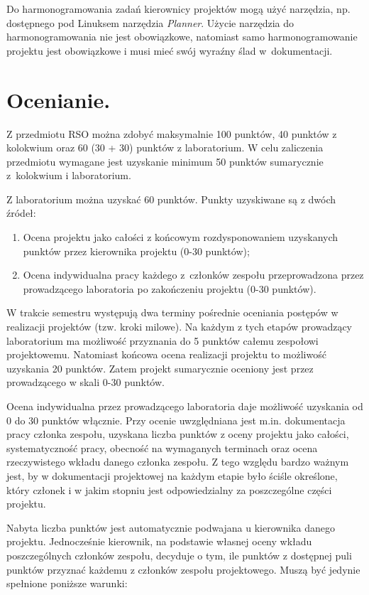 \documentclass[a4paper,11pt]{article}
\begin{document}
  Do harmonogramowania zadań kierownicy projektów mogą użyć narzędzia, np. dostępnego pod Linuksem narzędzia \textit{Planner}.
  Użycie narzędzia do harmonogramowania nie jest obowiązkowe, natomiast samo harmonogramowanie projektu jest obowiązkowe i musi mieć swój wyraźny ślad w~dokumentacji.

\section{Ocenianie.}
  Z przedmiotu RSO można zdobyć maksymalnie 100 punktów, 40 punktów z kolokwium oraz 60 (30 + 30) punktów z laboratorium.
  W celu zaliczenia przedmiotu wymagane jest uzyskanie minimum 50 punktów sumarycznie z~kolokwium i laboratorium.
  
  Z laboratorium można uzyskać 60 punktów. Punkty uzyskiwane są \linebreak z dwóch źródeł:
  \begin{enumerate}
    \item Ocena projektu jako całości z końcowym rozdysponowaniem uzyskanych punktów przez kierownika projektu (0-30 punktów);
    \item Ocena indywidualna pracy każdego z~członków zespołu przeprowadzona przez prowadzącego laboratoria po zakończeniu projektu (0-30 punktów).
  \end{enumerate}
  
  W trakcie semestru występują dwa terminy pośrednie oceniania postępów w realizacji projektów (tzw. kroki milowe).
  Na każdym z tych etapów prowadzący laboratorium ma możliwość przyznania do 5 punktów całemu zespołowi projektowemu.
  Natomiast końcowa ocena realizacji projektu to możliwość uzyskania 20 punktów.
  Zatem projekt sumarycznie oceniony jest przez prowadzącego w skali 0-30 punktów. 
  
  Ocena indywidualna przez prowadzącego laboratoria daje możliwość uzyskania od 0 do 30 punktów włącznie.
  Przy ocenie uwzględniana jest m.in. dokumentacja pracy członka zespołu, uzyskana liczba punktów z oceny projektu jako całości, systematyczność pracy,
  obecność na wymaganych terminach oraz ocena rzeczywistego wkładu danego członka zespołu.
  Z tego względu bardzo ważnym jest, by w dokumentacji projektowej na każdym etapie było ściśle określone, który członek i w jakim stopniu jest odpowiedzialny za poszczególne części projektu.
  
  Nabyta liczba punktów jest automatycznie podwajana u kierownika danego projektu.
  Jednocześnie kierownik, na podstawie własnej oceny wkładu poszczególnych członków zespołu, decyduje o tym, ile punktów z dostępnej puli punktów przyznać każdemu z członków zespołu projektowego.
  Muszą być jedynie spełnione poniższe warunki: 
\end{document}
